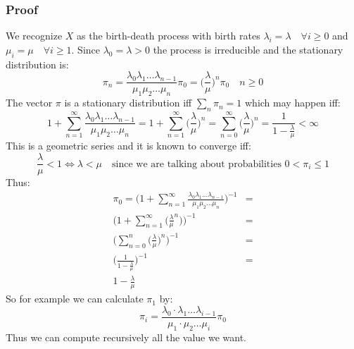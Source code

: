 \subsubsection{Proof}
We recognize $X$ as the birth-death process with birth rates $\lambda_i =\lambda \quad \forall i \geq 0$ and $\mu_i =\mu \quad \forall i \geq 1$. Since $\lambda_0 = \lambda > 0$ the process is irreducible and the stationary distribution is:
$$
\pi_n = \frac{\lambda_0\lambda_1 \hdots \lambda_{n-1}}{\mu_1\mu_2 \hdots \mu_n}\pi_0 = \Bigg(\frac{\lambda}{\mu}\Bigg)^n \pi_0 \quad n \geq 0
$$
The vector $\pi$ is a stationary distribution iff $\sum_n \pi_n = 1$ which may happen iff:
$$
1 + \sum_{n = 1}^\infty \frac{\lambda_0\lambda_1 \hdots \lambda_{n-1}}{\mu_1\mu_2 \hdots \mu_n} = 1 + \sum_{n = 1}^\infty \Bigg(\frac{\lambda}{\mu}\Bigg)^n = \sum_{n=0}^\infty \Bigg(\frac{\lambda}{\mu}\Bigg)^n = \frac{1}{1-\frac{\lambda}{\mu}}< \infty
$$
This is a geometric series and it is known to converge iff:
$$\frac{\lambda}{\mu} < 1 \iff \lambda < \mu \quad \text{since we are talking about probabilities } 0 < \pi_i \leq 1 $$
Thus: 
\begin{align*}
\pi_0 = \Bigg(1 + \sum_{n = 1}^\infty \frac{\lambda_0\lambda_1 \hdots \lambda_{n-1}}{\mu_1\mu_2 \hdots \mu_n}\Bigg)^{-1} &=\\
\Bigg(1 + \sum_{n = 1}^\infty\Big(\frac{\lambda}{\mu}^n\Big)\Bigg)^{-1} &=\\
\Bigg(\sum_{n = 0}^n\Big(\frac{\lambda}{\mu}\Big)^n\Bigg)^{-1} &=\\
\Bigg(\frac{1}{1-\frac{\lambda}{\mu}}\Bigg)^{-1} &=\\
1 - \frac{\lambda}{\mu}
\end{align*}
So for example we can calculate $\pi_1$ by: 
$$
\pi_i =  \frac{\lambda_{0} \cdot \lambda_{1} \dots \lambda_{i-1}}{\mu_{1} \cdot \mu_{2} \dots \mu_{i}}\pi_0
$$
Thus we can compute recursively all the value we want.